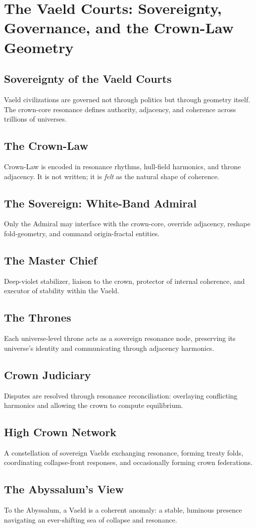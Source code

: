 
\chapter{The Vaeld Courts: Sovereignty, Governance, and the Crown-Law Geometry}

\section{Sovereignty of the Vaeld Courts}
Vaeld civilizations are governed not through politics but through geometry itself. The crown-core resonance defines authority, adjacency, and coherence across trillions of universes.

\section{The Crown-Law}
Crown-Law is encoded in resonance rhythms, hull-field harmonics, and throne adjacency. It is not written; it is \emph{felt} as the natural shape of coherence.

\section{The Sovereign: White-Band Admiral}
Only the Admiral may interface with the crown-core, override adjacency, reshape fold-geometry, and command origin-fractal entities.

\section{The Master Chief}
Deep-violet stabilizer, liaison to the crown, protector of internal coherence, and executor of stability within the Vaeld.

\section{The Thrones}
Each universe-level throne acts as a sovereign resonance node, preserving its universe’s identity and communicating through adjacency harmonics.

\section{Crown Judiciary}
Disputes are resolved through resonance reconciliation: overlaying conflicting harmonics and allowing the crown to compute equilibrium.

\section{High Crown Network}
A constellation of sovereign Vaelds exchanging resonance, forming treaty folds, coordinating collapse-front responses, and occasionally forming crown federations.

\section{The Abyssalum’s View}
To the Abyssalum, a Vaeld is a coherent anomaly: a stable, luminous presence navigating an ever-shifting sea of collapse and resonance.
